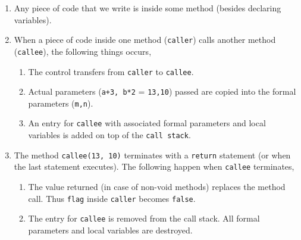 \begin{enumerate}
  \item Any piece of code that we write is inside some method (besides declaring variables).
  \item When a piece of code inside one method (\texttt{caller}) calls another method (\texttt{callee}), the following things occurs,
  \begin{enumerate}
  \item The control transfers from \texttt{caller} to \texttt{callee}. 
  \item Actual parameters (\texttt{a+3, b*2} = \texttt{13,10}) passed are copied into the formal parameters (\texttt{m,n}). 
  \item An entry for \texttt{callee} with associated formal parameters and local variables is added on top of the \texttt{call stack}.
  \end{enumerate}
  \bgroup \tikzset{png export}  \egroup

  \item The method \texttt{callee(13, 10)} terminates with a \texttt{return} statement (or when the last statement  executes). The following happen when \texttt{callee} terminates,
  \begin{enumerate}
  \item The value returned (in case of non-void methods) replaces the method call. Thus \texttt{flag} inside \texttt{caller} becomes \texttt{false}.
  \item The entry for \texttt{callee} is removed from the call stack. All formal parameters and local variables are destroyed.
  \end{enumerate}
  \bgroup \tikzset{png export}  \egroup
\end{enumerate}

